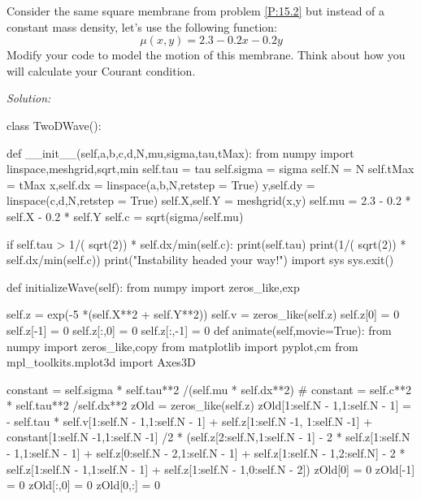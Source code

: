 \begin{enumerate}
\prob Consider the same square membrane from problem \ref{P:15.2} but
instead of a constant mass density, let's use the following function:
\begin{equation}
\mu(x,y) = 2.3 - 0.2 x - 0.2 y
\end{equation}
Modify your code to model the motion of this membrane.  Think about
how you will calculate your Courant condition.
\end{enumerate}
\ifsolutions
\textit{Solution:}\\
\begin{codeexample}
\begin{VerbatimOut}{\listingFile}




class TwoDWave():

    def __init__(self,a,b,c,d,N,mu,sigma,tau,tMax):
        from numpy import linspace,meshgrid,sqrt,min
        self.tau = tau
        self.sigma = sigma
        self.N = N
        self.tMax = tMax
        x,self.dx = linspace(a,b,N,retstep = True)
        y,self.dy = linspace(c,d,N,retstep = True)
        self.X,self.Y = meshgrid(x,y)
        self.mu = 2.3 - 0.2 * self.X - 0.2 * self.Y
        self.c = sqrt(sigma/self.mu)

        if self.tau > 1/( sqrt(2)) *  self.dx/min(self.c):
            print(self.tau)
            print(1/( sqrt(2)) *  self.dx/min(self.c))
            print("Instability headed your way!")
            import sys
            sys.exit()

    def initializeWave(self):
        from numpy import zeros_like,exp
        
        self.z = exp(-5 *(self.X**2 + self.Y**2))
        self.v = zeros_like(self.z)
        self.z[0] = 0
        self.z[-1] = 0
        self.z[:,0] = 0
        self.z[:,-1] = 0
    def animate(self,movie=True):
        from numpy import zeros_like,copy
        from matplotlib import pyplot,cm
        from mpl_toolkits.mplot3d import Axes3D
        
        constant = self.sigma * self.tau**2 /(self.mu * self.dx**2)
        #        constant = self.c**2 * self.tau**2 /self.dx**2
        zOld = zeros_like(self.z)
        zOld[1:self.N - 1,1:self.N - 1] = - self.tau * self.v[1:self.N - 1,1:self.N - 1] + self.z[1:self.N -1, 1:self.N -1] + constant[1:self.N -1,1:self.N -1] /2 * (self.z[2:self.N,1:self.N - 1] - 2 * self.z[1:self.N - 1,1:self.N - 1] + self.z[0:self.N - 2,1:self.N - 1] + self.z[1:self.N - 1,2:self.N] - 2 * self.z[1:self.N - 1,1:self.N - 1] + self.z[1:self.N - 1,0:self.N - 2])
        zOld[0] = 0
        zOld[-1] = 0
        zOld[:,0] = 0
        zOld[0,:] = 0


\end{VerbatimOut}
\end{codeexample}
